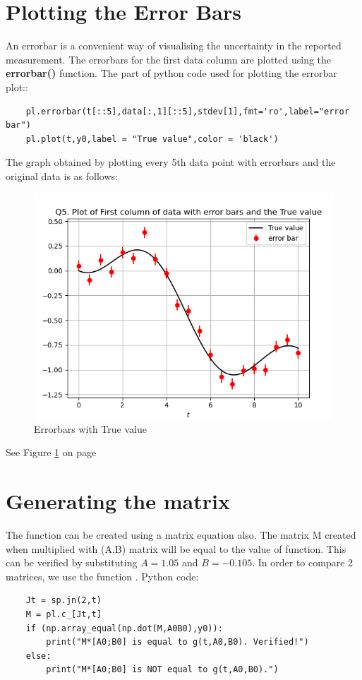 \documentclass[11pt, a4paper]{article}
\begin{document}
\section{Plotting the Error Bars}
An errorbar is a convenient way of visualising the uncertainty in the reported measurement. The errorbars for the first data column are plotted using the \textbf{errorbar()} function. The part of python code used for plotting the errorbar plot::
\begin{verbatim}	
    pl.errorbar(t[::5],data[:,1][::5],stdev[1],fmt='ro',label="error bar")
    pl.plot(t,y0,label = "True value",color = 'black')
\end{verbatim}
 The graph obtained by plotting every 5th data point with errorbars and the original data is as follows:   
\begin{figure}[h]
   	\centering
   	\includegraphics[scale=0.6]{ErrorBar.png}   
   	\caption{Errorbars with True value}
   	\label{fig:Figure 2}
\end{figure} 
See Figure \ref{fig:Figure 2} on page \pageref{fig:Figure 2}
  
\section{Generating the matrix}
The function can be created using a matrix equation also. The matrix M created when multiplied with (A,B) matrix will be equal to the value of function. This can be verified by substituting $A=1.05$ and $B=-0.105$. In order to compare 2 matrices, we use the function . Python code:
\begin{verbatim}	
    Jt = sp.jn(2,t)
    M = pl.c_[Jt,t]
    if (np.array_equal(np.dot(M,A0B0),y0)):
        print("M*[A0;B0] is equal to g(t,A0,B0). Verified!")
    else:
        print("M*[A0;B0] is NOT equal to g(t,A0,B0).")
\end{verbatim} 
\end{document}
